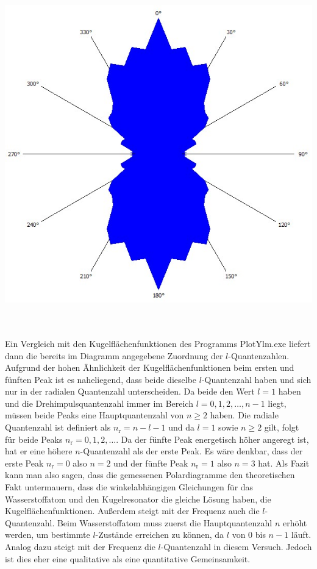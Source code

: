 \documentclass[german,  %
parskip=full,  %
]{scrartcl}
\begin{document}
\\\\
\begin{minipage}{0.48 \textwidth} \centering
\includegraphics[scale=0.3]{432_Peak_5.jpg}
\end{minipage}
\\\\
Ein Vergleich mit den Kugelflächenfunktionen des Programms PlotYlm.exe liefert dann die bereits im Diagramm angegebene Zuordnung der \(l\)-Quantenzahlen. Aufgrund der hohen Ähnlichkeit der Kugelflächenfunktionen beim ersten und fünften Peak ist es naheliegend, dass beide dieselbe \(l\)-Quantenzahl haben und sich nur in der radialen Quantenzahl unterscheiden. Da beide den Wert \(l=1\) haben und die Drehimpulsquantenzahl immer im Bereich \(l = 0,1,2,\hdots, n-1\) liegt, müssen beide Peaks eine Hauptquantenzahl von \(n\geq 2\) haben. Die radiale Quantenzahl ist definiert als \(n_{\mathrm{r}} = n-l-1\) und da \(l=1\) sowie \(n\geq 2\) gilt, folgt für beide Peaks \( n_{\mathrm{r}} = 0,1,2, \hdots\). Da der fünfte Peak energetisch höher angeregt ist, hat er eine höhere \(n\)-Quantenzahl als der erste Peak. Es wäre denkbar, dass der erste Peak \(n_{\mathrm{r}}=0\) also \(n=2\) und der fünfte Peak \(n_{\mathrm{r}}=1\) also \(n=3\) hat.
\newline Als Fazit kann man also sagen, dass die gemessenen Polardiagramme den theoretischen Fakt untermauern, dass die winkelabhängigen Gleichungen für das Wasserstoffatom und den Kugelresonator die gleiche Lösung haben, die Kugelflächenfunktionen. Außerdem steigt mit der Frequenz auch die \(l\)-Quantenzahl. Beim Wasserstoffatom muss zuerst die Hauptquantenzahl $n$ erhöht werden, um bestimmte \(l\)-Zustände erreichen zu können, da $l$ von $0$ bis $n-1$ läuft. Analog dazu steigt mit der Frequenz die \(l\)-Quantenzahl in diesem Versuch. Jedoch ist dies eher eine qualitative als eine quantitative Gemeinsamkeit.
\end{document}
